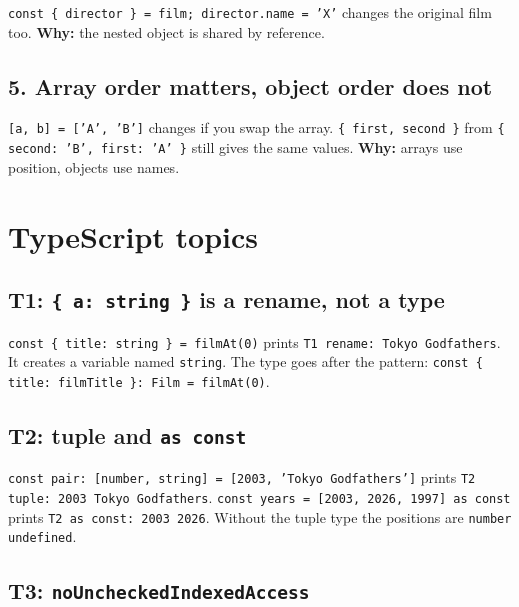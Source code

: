 \documentclass[
  11pt,
]{article}
\begin{document}
\texttt{const \{ director \} = film; director.name = 'X'}
changes the original film too. \textbf{Why:} the nested object is shared
by reference.

\subsection{5. Array order matters, object order does
not}\label{array-order-matters-object-order-does-not}

\texttt{[a, b] = ['A', 'B']} changes if you swap the
array. \texttt{\{ first, second \}} from
\texttt{\{ second: 'B', first: 'A' \}} still gives the
same values. \textbf{Why:} arrays use position, objects use names.

\section{TypeScript topics}\label{typescript-topics}

\subsection{\texorpdfstring{T1: \texttt{\{\ a:\ string\ \}} is a rename,
not a
type}{T1: \{ a: string \} is a rename, not a type}}\label{t1-a-string-is-a-rename-not-a-type}

\texttt{const \{ title: string \} = filmAt(0)} prints
\texttt{T1 rename: Tokyo Godfathers}. It creates a
variable named \texttt{string}. The type goes after the
pattern:
\texttt{const \{ title: filmTitle \}: Film = filmAt(0)}.

\subsection{\texorpdfstring{T2: tuple and
\texttt{as\ const}}{T2: tuple and as const}}\label{t2-tuple-and-as-const}

\texttt{const pair: [number, string] = [2003, 'Tokyo Godfathers']}
prints \texttt{T2 tuple: 2003 Tokyo Godfathers}.
\texttt{const years = [2003, 2026, 1997] as const}
prints \texttt{T2 as const: 2003 2026}. Without the
tuple type the positions are
\texttt{number \textbar{} undefined}.

\subsection{\texorpdfstring{T3:
\texttt{noUncheckedIndexedAccess}}{T3: noUncheckedIndexedAccess}}\label{t3-nouncheckedindexedaccess}
\end{document}

